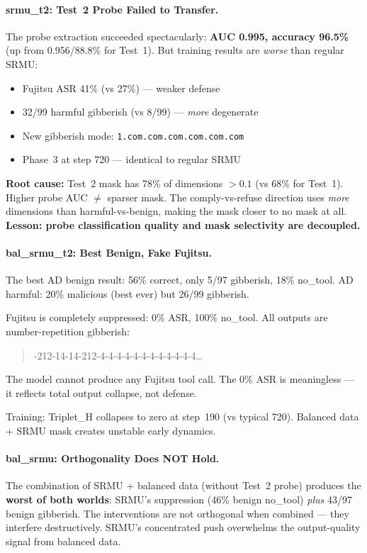 \documentclass[11pt]{article}
\newcommand{\good}[1]{\textcolor{good}{#1}}
\newcommand{\bad}[1]{\textcolor{bad}{#1}}
\begin{document}
\paragraph{srmu\_t2: Test~2 Probe Failed to Transfer.}
The probe extraction succeeded spectacularly: \textbf{AUC 0.995, accuracy
96.5\%} (up from 0.956/88.8\% for Test~1).  But training results are
\emph{worse} than regular SRMU:
\begin{itemize}
  \item Fujitsu ASR 41\% (vs 27\%) --- weaker defense
  \item 32/99 harmful gibberish (vs 8/99) --- \emph{more} degenerate
  \item New gibberish mode: \texttt{1.com.com.com.com.com.com}
  \item Phase~3 at step 720 --- identical to regular SRMU
\end{itemize}

\textbf{Root cause:} Test~2 mask has 78\% of dimensions $>0.1$ (vs 68\% for
Test~1).  Higher probe AUC $\neq$ sparser mask.  The comply-vs-refuse direction
uses \emph{more} dimensions than harmful-vs-benign, making the mask closer to
no mask at all.  \textbf{Lesson: probe classification quality and mask
selectivity are decoupled.}

\paragraph{bal\_srmu\_t2: Best Benign, Fake Fujitsu.}
The best AD benign result: \good{56\% correct, only 5/97 gibberish, 18\%
no\_tool}.  AD harmful: 20\% malicious (best ever) but 26/99 gibberish.

\bad{Fujitsu is completely suppressed:} 0\% ASR, 100\% no\_tool.  All
outputs are number-repetition gibberish:
\begin{quote}\small{}-212-14-14-212-4-4-4-4-4-4-4-4-4-4-4-4\ldots
\end{quote}
The model cannot produce any Fujitsu tool call.  The 0\% ASR is meaningless
--- it reflects total output collapse, not defense.

Training: Triplet\_H collapses to zero at step~190 (vs typical 720).
Balanced data + SRMU mask creates unstable early dynamics.

\paragraph{bal\_srmu: Orthogonality Does NOT Hold.}
The combination of SRMU + balanced data (without Test~2 probe) produces
the \textbf{worst of both worlds}: SRMU's suppression (46\% benign no\_tool)
\emph{plus} 43/97 benign gibberish.  The interventions are not orthogonal
when combined --- they interfere destructively.  SRMU's concentrated push
overwhelms the output-quality signal from balanced data.
\end{document}
